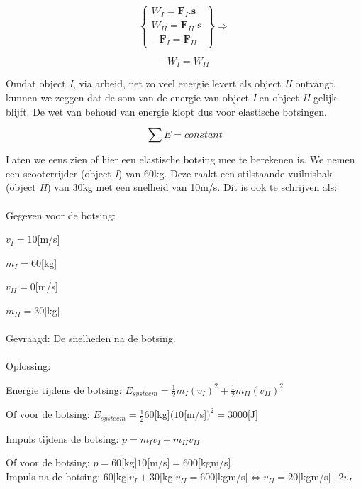 \begin{equation}
\left\{ \begin{array}{c}
W_{I}=\mathbf{F}_{I}.\mathbf{s}\\
W_{II}=\mathbf{F}_{II}.\mathbf{s}\\
-\mathbf{F}_{I}=\mathbf{F}_{II}
\end{array}\right\} \Longrightarrow
\end{equation}


\begin{equation}
-W_{I}=W_{II}
\end{equation}


Omdat object \emph{I}, via arbeid, net zo veel energie levert als
object \emph{II} ontvangt, kunnen we zeggen dat de som van de energie
van object \emph{I} en object \emph{II} gelijk blijft. De wet van
behoud van energie klopt dus voor elastische botsingen.

\begin{equation}
\sum E=constant
\end{equation}


Laten we eens zien of hier een elastische botsing mee te berekenen
is. We nemen een scooterrijder (object \emph{I}) van 60kg. Deze raakt
een stilstaande vuilnisbak (object \emph{II}) van 30kg met een snelheid
van 10m/s. Dit is ook te schrijven als:\\
\\
Gegeven voor de botsing: 

$v_{I}=10${[}m/s{]}

$m_{I}=60${[}kg{]}

$v_{II}=0${[}m/s{]}

$m_{II}=30${[}kg{]}\\
\\
Gevraagd: De snelheden na de botsing.\\
\\
Oplossing:

Energie tijdens de botsing: $E_{systeem}=\frac{1}{2}m_{I}(v_{I})^{2}+\frac{1}{2}m_{II}(v_{II})^{2}$

Of voor de botsing: $E_{systeem}=\frac{1}{2}60${[}kg{]}$(10${[}m/s{]}$)^{2}=3000${[}J{]}

Impuls tijdens de botsing: $p=m_{I}v_{I}+m_{II}v_{II}$

Of voor de botsing: $p=60${[}kg{]}$10${[}m/s{]}$=600${[}kgm/s{]}\\


Impuls na de botsing: $60${[}kg{]}$v_{I}+30${[}kg{]}$v_{II}=600${[}kgm/s{]}$\Longleftrightarrow$$v_{II}=20${[}kgm/s{]}$-2v_{I}$

